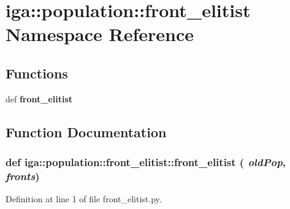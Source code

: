 \section{iga::population::front\_\-elitist Namespace Reference}
\label{namespaceiga_1_1population_1_1front__elitist}


\subsection*{Functions}
\begin{CompactItemize}
\item 
def {\bf front\_\-elitist}
\end{CompactItemize}


\subsection{Function Documentation}
\subsubsection{\setlength{\rightskip}{0pt plus 5cm}def iga::population::front\_\-elitist::front\_\-elitist ( {\em oldPop},  {\em fronts})}\label{namespaceiga_1_1population_1_1front__elitist_276c98c4080ce5376ebc96df1c7945c7}




Definition at line 1 of file front\_\-elitist.py.